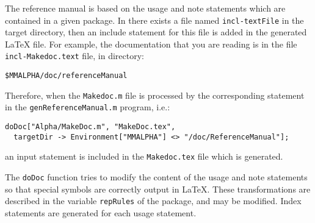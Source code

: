 The reference manual is based on the usage and note statements which are
contained in a given package. In there exists a file named 
\texttt{incl-textFile} in the target directory, then an include 
statement for this file is added in the generated \LaTeX{} file.
For example, the documentation that you are reading is in the 
file \texttt{incl-Makedoc.text} file, in directory:
\begin{verbatim}
$MMALPHA/doc/referenceManual
\end{verbatim}
Therefore, when the 
\texttt{Makedoc.m} file is processed by the corresponding 
statement in the \texttt{genReferenceManual.m} program, i.e.:
\begin{small}
\begin{verbatim}
doDoc["Alpha/MakeDoc.m", "MakeDoc.tex", 
  targetDir -> Environment["MMALPHA"] <> "/doc/ReferenceManual"];
\end{verbatim}
\end{small}
an input statement is included in the \texttt{Makedoc.tex} file 
which is generated.

The \texttt{doDoc} function tries to modify the content of the
usage and note statements so that special symbols are correctly
output in \LaTeX{}. These transformations are described in the
variable \texttt{repRules} of the package, and may be modified. 
Index statements are generated for each usage statement. 

